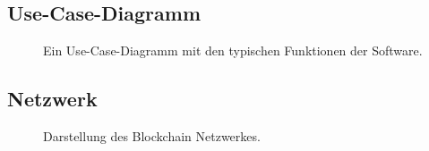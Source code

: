 \documentclass[parskip=full,11pt,twoside]{scrartcl}
\begin{document}
\subsection{Use-Case-Diagramm}
\begin{figure}[hb]
	\caption{\label{fig:usecase}
		Ein Use-Case-Diagramm mit den typischen Funktionen der Software.
	}
\end{figure}

\subsection{Netzwerk}
\begin{figure}[hb]
	\caption{\label{fig:network}
		Darstellung des Blockchain Netzwerkes.
	}
\end{figure}
\end{document}
